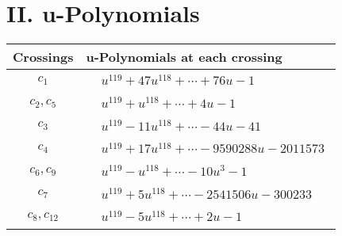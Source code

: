 \documentclass[1p]{elsarticle_modified}
\theoremstyle{definition}
\begin{document}
\newpage\renewcommand{\arraystretch}{1}
\centering \section*{ II. u-Polynomials}
\begin{tabular}{m{50pt}|m{274pt}}
Crossings & \hspace{64pt}u-Polynomials at each crossing \\
\hline $$\begin{aligned}c_{1}\end{aligned}$$&$\begin{aligned}
&u^{119}+47 u^{118}+\cdots+76 u-1
\end{aligned}$\\
\hline $$\begin{aligned}c_{2},c_{5}\end{aligned}$$&$\begin{aligned}
&u^{119}+u^{118}+\cdots+4 u-1
\end{aligned}$\\
\hline $$\begin{aligned}c_{3}\end{aligned}$$&$\begin{aligned}
&u^{119}-11 u^{118}+\cdots-44 u-41
\end{aligned}$\\
\hline $$\begin{aligned}c_{4}\end{aligned}$$&$\begin{aligned}
&u^{119}+17 u^{118}+\cdots-9590288 u-2011573
\end{aligned}$\\
\hline $$\begin{aligned}c_{6},c_{9}\end{aligned}$$&$\begin{aligned}
&u^{119}- u^{118}+\cdots-10 u^3-1
\end{aligned}$\\
\hline $$\begin{aligned}c_{7}\end{aligned}$$&$\begin{aligned}
&u^{119}+5 u^{118}+\cdots-2541506 u-300233
\end{aligned}$\\
\hline $$\begin{aligned}c_{8},c_{12}\end{aligned}$$&$\begin{aligned}
&u^{119}-5 u^{118}+\cdots+2 u-1
\end{aligned}$\\

\end{tabular}
\end{document}

